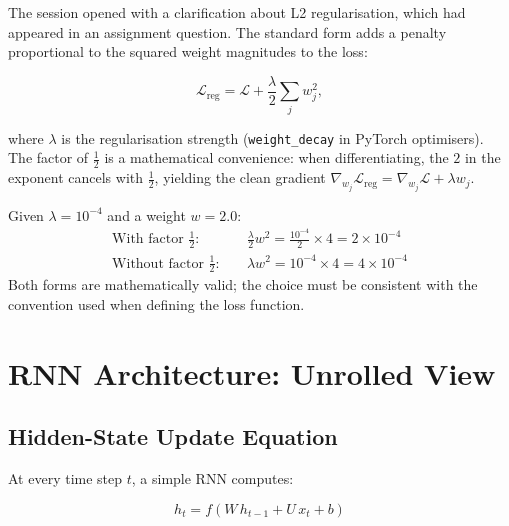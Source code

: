 \documentclass[12pt,a4paper]{article}
\begin{document}
The session opened with a clarification about L2 regularisation,
which had appeared in an assignment question.  The standard form adds
a penalty proportional to the squared weight magnitudes to the loss:

\begin{equation}
  \mathcal{L}_{\text{reg}} = \mathcal{L} + \frac{\lambda}{2}
  \sum_{j} w_j^2,
  \label{eq:l2_regularisation}
\end{equation}

where $\lambda$ is the regularisation strength (\texttt{weight\_decay}
in PyTorch optimisers).  The factor of $\tfrac{1}{2}$ is a
mathematical convenience: when differentiating, the $2$ in the
exponent cancels with $\tfrac{1}{2}$, yielding the clean gradient
$\nabla_{w_j}\mathcal{L}_{\text{reg}} = \nabla_{w_j}\mathcal{L} +
\lambda w_j$.

\begin{example}[title=L2 Penalty Calculation]
  Given $\lambda = 10^{-4}$ and a weight $w = 2.0$:
  \begin{align}
    \text{With factor } \tfrac{1}{2}:&\quad
      \frac{\lambda}{2} w^2 = \frac{10^{-4}}{2} \times 4 = 2 \times 10^{-4} \\
    \text{Without factor } \tfrac{1}{2}:&\quad
      \lambda w^2 = 10^{-4} \times 4 = 4 \times 10^{-4}
  \end{align}
  Both forms are mathematically valid; the choice must be consistent
  with the convention used when defining the loss function.
\end{example}

\section{RNN Architecture: Unrolled View}
\label{sec:rnn_architecture}

\subsection{Hidden-State Update Equation}
\label{subsec:hidden_state}

At every time step $t$, a simple RNN computes:

\begin{equation}
  \boxed{h_t = f\!\left(W\,h_{t-1} + U\,x_t + b\right)}
  \label{eq:rnn_update}
\end{equation}
\end{document}
